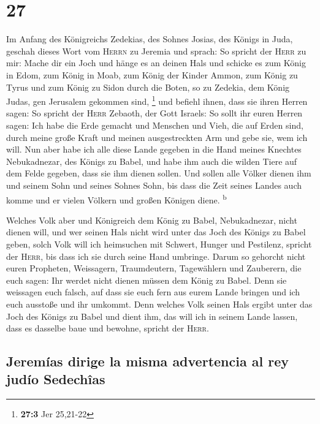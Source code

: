 \hypertarget{section-26}{%
\section{27}\label{section-26}}

 Im Anfang des Königreichs Zedekias, des Sohnes Josias,
des Königs in Juda, geschah dieses Wort vom \textsc{Herrn} zu Jeremia
und sprach:  So spricht der \textsc{Herr} zu mir: Mache
dir ein Joch und hänge es an deinen Hals  und schicke es
zum König in Edom, zum König in Moab, zum König der Kinder Ammon, zum
König zu Tyrus und zum König zu Sidon durch die Boten, so zu Zedekia,
dem König Judas, gen Jerusalem gekommen sind, \footnote{\textbf{27:3}
  Jer 25,21-22}  und befiehl ihnen, dass sie ihren Herren
sagen: So spricht der \textsc{Herr} Zebaoth, der Gott Israels: So sollt
ihr euren Herren sagen:  Ich habe die Erde gemacht und
Menschen und Vieh, die auf Erden sind, durch meine große Kraft und
meinen ausgestreckten Arm und gebe sie, wem ich will.  Nun
aber habe ich alle diese Lande gegeben in die Hand meines Knechtes
Nebukadnezar, des Königs zu Babel, und habe ihm auch die wilden Tiere
auf dem Felde gegeben, dass sie ihm dienen sollen.  Und
sollen alle Völker dienen ihm und seinem Sohn und seines Sohnes Sohn,
bis dass die Zeit seines Landes auch komme und er vielen Völkern und
großen Königen diene. \textsuperscript{b}

 Welches Volk aber und Königreich dem König zu Babel,
Nebukadnezar, nicht dienen will, und wer seinen Hals nicht wird unter
das Joch des Königs zu Babel geben, solch Volk will ich heimsuchen mit
Schwert, Hunger und Pestilenz, spricht der \textsc{Herr}, bis dass ich
sie durch seine Hand umbringe.  Darum so gehorcht nicht
euren Propheten, Weissagern, Traumdeutern, Tagewählern und Zauberern,
die euch sagen: Ihr werdet nicht dienen müssen dem König zu Babel.
 Denn sie weissagen euch falsch, auf dass sie euch fern
aus eurem Lande bringen und ich euch ausstoße und ihr umkommt.
 Denn welches Volk seinen Hals ergibt unter das Joch des
Königs zu Babel und dient ihm, das will ich in seinem Lande lassen, dass
es dasselbe baue und bewohne, spricht der \textsc{Herr}.

\hypertarget{jeremuxedas-dirige-la-misma-advertencia-al-rey-juduxedo-sedechuxeeas}{%
\subsection{Jeremías dirige la misma advertencia al rey judío
Sedechîas}\label{jeremuxedas-dirige-la-misma-advertencia-al-rey-juduxedo-sedechuxeeas}}

